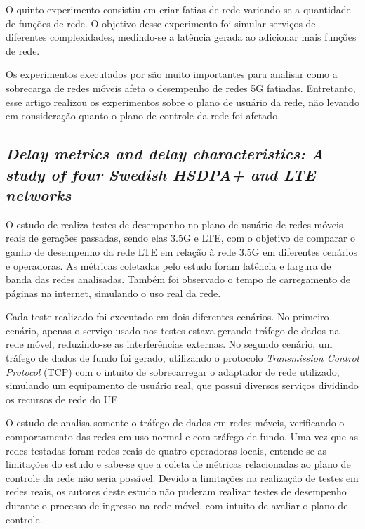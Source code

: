 O quinto experimento consistiu em criar fatias de rede variando-se a quantidade de funções de rede.
O objetivo desse experimento foi simular serviços de diferentes complexidades, medindo-se a latência gerada ao adicionar mais funções de rede.

Os experimentos executados por \cite{Lee2021} são muito importantes para analisar como a sobrecarga de redes móveis afeta o desempenho de redes 5G fatiadas.
Entretanto, esse artigo realizou os experimentos sobre o plano de usuário da rede, não levando em consideração quanto o plano de controle da rede foi afetado.

\subsection{\textit{Delay metrics and delay characteristics: A study of four Swedish HSDPA+ and LTE networks}}

O estudo de \cite{Garcia2015} realiza testes de desempenho no plano de usuário de redes móveis reais de gerações passadas, sendo elas 3.5G e LTE, com o objetivo de comparar o ganho de desempenho da rede LTE em relação à rede 3.5G em diferentes cenários e operadoras.
As métricas coletadas pelo estudo foram latência e largura de banda das redes analisadas.
Também foi observado o tempo de carregamento de páginas na internet, simulando o uso real da rede.

Cada teste realizado foi executado em dois diferentes cenários.
No primeiro cenário, apenas o serviço usado nos testes estava gerando tráfego de dados na rede móvel, reduzindo-se as interferências externas.
No segundo cenário, um tráfego de dados de fundo foi gerado, utilizando o protocolo \textit{Transmission Control Protocol} (TCP) com o intuito de sobrecarregar o adaptador de rede utilizado, simulando um equipamento de usuário real, que possui diversos serviços dividindo os recursos de rede do UE.

O estudo de \cite{Garcia2015} analisa somente o tráfego de dados em redes móveis, verificando o comportamento das redes em uso normal e com tráfego de fundo.
Uma vez que as redes testadas foram redes reais de quatro operadoras locais, entende-se as limitações do estudo e sabe-se que a coleta de métricas relacionadas ao plano de controle da rede não seria possível.
Devido a limitações na realização de testes em redes reais, os autores deste estudo não puderam realizar testes de desempenho durante o processo de ingresso na rede móvel, com intuito de avaliar o plano de controle.

